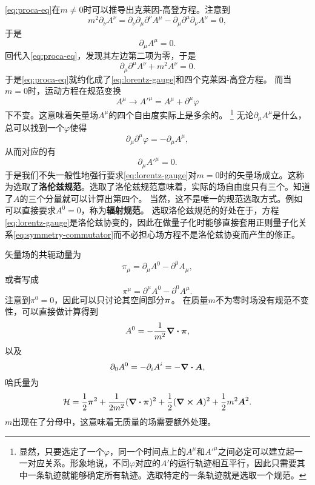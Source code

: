 \documentclass[hyperref, UTF8, a4paper]{ctexart}
\begin{document}
\eqref{eq:proca-eq}在$m \neq 0$时可以推导出克莱因-高登方程。注意到
\[
    m^2 \partial_\nu A^\nu = \partial_\nu \partial_\mu \partial^\nu A^\mu - \partial_\mu \partial^\mu \partial_\nu A^\nu = 0,
\]
于是
\begin{equation}
    \partial_\mu A^\mu = 0.
    \label{eq:lorentz-gauge}
\end{equation}
回代入\eqref{eq:proca-eq}，发现其左边第二项为零，于是
\[
    \partial_\mu \partial^\mu A^\nu + m^2 A^\nu = 0.
\]
于是\eqref{eq:proca-eq}就约化成了\eqref{eq:lorentz-gauge}和四个克莱因-高登方程。
而当$m=0$时，运动方程在规范变换
\begin{equation}
    A^\mu \longrightarrow {A'}^\mu = A^\mu + \partial^\mu \varphi
\end{equation}
下不变。这意味着矢量场$A^\mu$的四个自由度实际上是多余的。%
\footnote{显然，只要选定了一个$\varphi$，同一个时间点上的$A^\mu$和${A'}^\mu$之间必定可以建立起一一对应关系。形象地说，不同$\varphi$对应的$A'$的运行轨迹相互平行，因此只需要其中一条轨迹就能够确定所有轨迹。选取特定的一条轨迹就是选取一个规范。}%
无论$\partial_\mu A^\mu$是什么，总可以找到一个$\varphi$使得
\[
    \partial_\mu \partial^\mu \varphi = - \partial_\mu A^\mu,
\]
从而对应的有
\[
    \partial_\mu {A'}^\mu = 0.
\]
于是我们不失一般性地强行要求\eqref{eq:lorentz-gauge}对$m=0$时的矢量场成立。这称为选取了\textbf{洛伦兹规范}。选取了洛伦兹规范意味着，实际的场自由度只有三个。知道了$A$的三个分量就可以计算出第四个。
当然，这不是唯一的规范选取方式。例如可以直接要求$A^0 = 0$，称为\textbf{辐射规范}。
选取洛伦兹规范的好处在于，方程\eqref{eq:lorentz-gauge}是洛伦兹协变的，因此在做量子化时能够直接套用正则量子化关系\eqref{eq:symmetry-commutator}而不必担心场方程不是洛伦兹协变而产生的修正。

矢量场的共轭动量为
\[
    \pi_\mu = \partial_\mu A^0 - \partial^0 A_\mu,
\]
或者写成
\begin{equation}
    \pi^\mu = \partial^\mu A^0 - \partial^0 A^\mu.
\end{equation}
注意到$\pi^0 = 0$，因此可以只讨论其空间部分$\vb*{\pi}$。
在质量$m$不为零时场没有规范不变性，可以直接做计算得到
\begin{equation}
    A^0 = - \frac{1}{m^2} \div{\vb*{\pi}},
\end{equation}
以及
\begin{equation}
    \partial_0 A^0 = - \partial_i A^i = - \div{\vb*{A}},
\end{equation}
哈氏量为
\begin{equation}
    \mathcal{H} = \frac{1}{2} \vb*{\pi}^2 + \frac{1}{2m^2} (\div{\vb*{\pi}})^2 + \frac{1}{2} (\curl{\vb*{A}})^2 + \frac{1}{2} m^2 \vb*{A}^2.
\end{equation}
$m$出现在了分母中，这意味着无质量的场需要额外处理。
\end{document}
